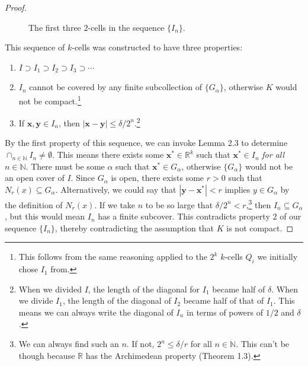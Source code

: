 \documentclass{article}
\newcommand{\N}{\mathbb{N}}
\newcommand{\R}{\mathbb{R}}
\newcommand{\x}{\mathbf{x}}
\newcommand{\y}{\mathbf{y}}
\theoremstyle{definition}
\begin{document}
\begin{proof}
\begin{figure}[h!]
	\caption{The first three $ 2 $-cells in the sequence $ \{I_n\} $.}
\end{figure}
This sequence of $ k $-cells was constructed to have three properties:
\begin{enumerate}
	\item $ I\supset I_1\supset I_2\supset I_3\supset\cdots $
	\item $ I_n $ cannot be covered by any finite subcollection of $ \{G_\alpha\} $, otherwise $ K $ would not be compact.\footnote{This follows from the same reasoning applied to the $ 2^k $ $ k $-cells $ Q_i $ we initially chose $ I_1 $ from.}
	\item If $ \x,\y\in I_n $, then $ |\x-\y|\le \delta/2^n $.\footnote{When we divided $ I $, the length of the diagonal for $ I_1 $ became half of $ \delta $. When we divide $ I_1 $, the length of the diagonal of $ I_2 $ became half of that of $ I_1 $. This means we can always write the diagonal of $ I_n $ in terms of powers of $ 1/2 $ and $ \delta $.  }
\end{enumerate}
By the first property of this sequence, we can invoke Lemma 2.3 to determine $ \cap_{n\in\N} I_n\neq\emptyset $. This means there exists some $ \x^*\in\R^k $ such that $ \x^*\in I_n $ \textit{for all} $ n\in\N $. There must be some $ \alpha $ such that $ \x^*\in G_\alpha $, otherwise $ \{G_\alpha\} $ would not be an open cover of $ I $. Since $ G_\alpha $ is open, there exists some $ r>0 $ such that $ N_r(x)\subseteq G_\alpha $. Alternatively, we could say that $ |\y-\x^*|<r $ implies $ y\in G_\alpha $ by the definition of $ N_r(x) $. If we take $ n $ to be so large that $ \delta/2^n<r $,\footnote{We can always find such an $ n $. If not, $ 2^n\le\delta /r $ for all $ n \in\N$. This can't be though because $ \R $ has the Archimedean property (Theorem 1.3).} then $ I_n\subseteq G_\alpha $, but this would mean $ I_n $ has a finite subcover. This contradicts property $ 2 $ of our sequence $ \{I_n\} $, thereby contradicting the assumption that $ K $ is not compact. 
\end{proof}
\end{document}
